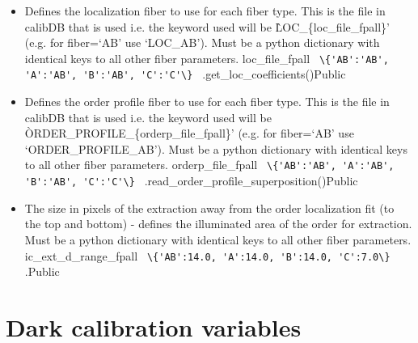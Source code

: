 \begin{itemize}
\item {}
{Defines the localization fiber to use for each fiber type. This is the file in calibDB that is used i.e. the keyword \masterCALIBDBfile used will be \`LOC\_\{loc\_file\_fpall\}' (e.g. for fiber=`AB' use `LOC\_AB'). Must be a python dictionary with identical keys to all other fiber parameters.}
{loc\_file\_fpall}
{\lstinline[style=pythoninline]| \{'AB':'AB', 'A':'AB', 'B':'AB', 'C':'C'\} |}
{\calextractRAW}{\constantsfile}
{\spirouLOCOR.get\_loc\_coefficients()}{Public}

\item {}
{Defines the order profile fiber to use for each fiber type. This is the file in calibDB that is used i.e. the keyword \masterCALIBDBfile used will be \`ORDER\_PROFILE\_\{orderp\_file\_fpall\}' (e.g. for fiber=`AB' use `ORDER\_PROFILE\_AB'). Must be a python dictionary with identical keys to all other fiber parameters.}
{orderp\_file\_fpall}
{\lstinline[style=pythoninline]| \{'AB':'AB', 'A':'AB', 'B':'AB', 'C':'C'\} |}
{\calextractRAW}{\constantsfile}
{\spirouFITS.read\_order\_profile\_superposition()}{Public}

\item {}
{The size in pixels of the extraction away from the order localization fit (to the top and bottom) - defines the illuminated area of the order for extraction. Must be a python dictionary with identical keys to all other fiber parameters.}
{ic\_ext\_d\_range\_fpall}
{\lstinline[style=pythoninline]| \{'AB':14.0, 'A':14.0, 'B':14.0, 'C':7.0\} |}
{\calDRIFTRAW}{\constantsfile}
{\calDRIFTRAW.\progMAIN}{Public}

\end{itemize}


\clearpage
\newpage
\section{Dark calibration variables}
\label{ch:variables:dark}


